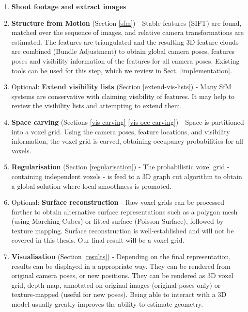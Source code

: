 \begin{enumerate}
  \item \textbf{Shoot footage and extract images}
  \item \textbf{Structure from Motion} (Section \ref{sfm}) - Stable features (\ie SIFT) are found, matched over the sequence of images, and relative camera transformations are estimated. The features are triangulated and the resulting 3D feature clouds are combined (\ie Bundle Adjustment) to obtain global camera poses, features poses and visibility information of the features for all camera poses. Existing tools can be used for this step, which we review in Sect. \ref{implementation}.
  \item Optional: \textbf{Extend visibility lists} (Section \ref{extend-vis-lists}) - Many SfM systems are conservative with claiming visibility of features. It may help to review the visibility lists and attempting to extend them.
  \item \textbf{Space carving} (Sections \ref{vis-carving}-\ref{vis-occ-carving}) - Space is partitioned into a voxel grid. Using the camera poses, feature locations, and visibility information, the voxel grid is carved, obtaining occupancy probabilities for all voxels.
  \item \textbf{Regularisation} (Section \ref{regularisation}) - The probabilistic voxel grid - containing independent voxels - is feed to a 3D graph cut algorithm to obtain a global solution where local smoothness is promoted.
  \item Optional: \textbf{Surface reconstruction} - Raw voxel grids can be processed further to obtain alternative surface representations such as a polygon mesh (\ie using Marching Cubes) or fitted surface (\ie Poisson Surface), followed by texture mapping. Surface reconstruction is well-established and will not be covered in this thesis. Our final result will be a voxel grid. %
  \item \textbf{Visualisation} (Section \ref{results}) - Depending on the final representation, results can be displayed in a appropriate way. They can be rendered from original camera poses, or new positions. They can be rendered as 3D voxel grid, depth map, annotated on original images (original poses only) or texture-mapped (useful for new poses). Being able to interact with a 3D model usually greatly improves the ability to estimate geometry.
\end{enumerate}


